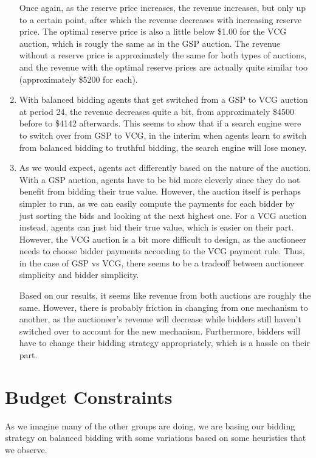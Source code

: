 \documentclass[12pt]{article}
\begin{document}
\begin{enumerate}[label=(\alph*)]
Once again, as the reserve price increases, the revenue increases, but only up to a certain point, after which the revenue decreases with increasing reserve price. The optimal reserve price is also a little below \$1.00 for the VCG auction, which is rougly the same as in the GSP auction. The revenue without a reserve price is approximately the same for both types of auctions, and the revenue with the optimal reserve prices are actually quite similar too (approximately \$5200 for each).

\item With balanced bidding agents that get switched from a GSP to VCG auction at period 24, the revenue decreases quite a bit, from approximately \$4500 before to \$4142 afterwards. This seems to show that if a search engine were to switch over from GSP to VCG, in the interim when agents learn to switch from balanced bidding to truthful bidding, the search engine will lose money. 

\item As we would expect, agents act differently based on the nature of the auction. With a GSP auction, agents have to be bid more cleverly since they do not benefit from bidding their true value. However, the auction itself is perhaps simpler to run, as we can easily compute the payments for each bidder by just sorting the bids and looking at the next highest one. For a VCG auction instead, agents can just bid their true value, which is easier on their part. However, the VCG auction is a bit more difficult to design, as the auctioneer needs to choose bidder payments according to the VCG payment rule. Thus, in the case of GSP vs VCG, there seems to be a tradeoff between auctioneer simplicity and bidder simplicity.

Based on our results, it seems like revenue from both auctions are roughly the same. However, there is probably friction in changing from one mechanism to another, as the auctioneer's revenue will decrease while bidders still haven't switched over to account for the new mechanism. Furthermore, bidders will have to change their bidding strategy appropriately, which is a hassle on their part. 
\end{enumerate}

\section{Budget Constraints}

As we imagine many of the other groups are doing, we are basing our bidding strategy on balanced bidding with some variations based on some heuristics that we observe.\\
\end{document}
